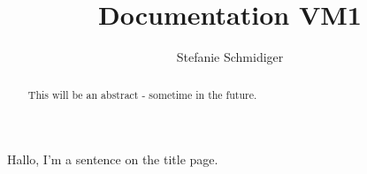 \documentclass[a4paper,
11pt]{article}
\title{Documentation VM1}
\author{Stefanie Schmidiger}
\begin{document}
\begin{titlepage}
\maketitle
Hallo, I'm a sentence on the title page.
\end{titlepage}

\begin{abstract}
This will be an abstract - sometime in the future.
\end{abstract}

\newpage
\newpage
\newpage
\newpage
\newpage
\newpage
\newpage
\newpage
\newpage
\end{document}
